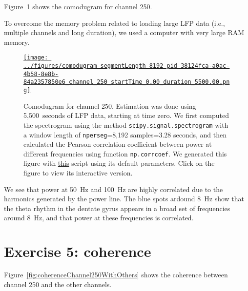 \documentclass[12pt]{article}
\begin{document}
Figure~\ref{fig:comodugramChannel250} shows the comodugram for channel 250.

To overcome the memory problem related to loading large LFP data (i.e.,
multiple channels and long duration), we used a computer with very large RAM memory.

\begin{figure}[H]
    \begin{center}
        \href{https://www.gatsby.ucl.ac.uk/~rapela/neuroinformatics/2023/ws3/figures/comodugram_segmentLength_8192_pid_38124fca-a0ac-4b58-8e8b-84a2357850e6_channel_250_startTime_0.00_duration_5500.00.html}{\texttt{[image: ../figures/comodugram\_segmentLength\_8192\_pid\_38124fca-a0ac-4b58-8e8b-84a2357850e6\_channel\_250\_startTime\_0.00\_duration\_5500.00.png]}}



        \caption{Comodugram for channel 250. Estimation was done using
        5,500~seconds of LFP data, starting at time zero. We first computed the
        spectrogram using the method \texttt{scipy.signal.spectrogram} with a
        window length of \texttt{nperseg}=8,192 samples=3.28 seconds, and then
        calculated the Pearson correlation coefficient between power at
        different frequencies using function \texttt{np.corrcoef}.  We
        generated this figure with
        \href{https://github.com/joacorapela/neuroinformatics23/blob/master/worksheets/ws3/mySolution/code/scripts/doPlotComodugram.py}{this}
        script using its default parameters.  Click on the figure to view its
        interactive version.  }

                \label{fig:comodugramChannel250}

            \end{center}
        \end{figure}

We see that power at 50~Hz and 100~Hz are highly correlated due to the
harmonics generated by the power line. The blue spots ardound 8~Hz show that
the theta rhythm in the dentate gyrus appears in a broad set of frequencies
around 8~Hz, and that power at these frequencies is correlated.

\section*{Exercise 5: coherence}

Figure~\ref{fig:coherenceChannel250WithOthers} shows the coherence between
channel 250 and the other channels.
\end{document}
